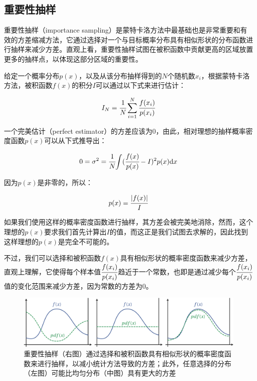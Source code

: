 \subsection{重要性抽样}
重要性抽样（importance sampling）是蒙特卡洛方法中最基础也是非常重要和有效的方差缩减方法，它通过选择对一个与目标概率分布具有相似形状的分布函数进行抽样来减少方差。直观上看，重要性抽样试图在被积函数中贡献更高的区域放置更多的抽样点，以体现这部分区域的重要性。

给定一个概率分布$p(x)$，以及从该分布抽样得到的$N$个随机数$x_i$，根据蒙特卡洛方法，被积函数$f(x)$的积分$I$可以通过以下式来进行估计：

\begin{equation}
	I_N= \cfrac{1}{N}\sum_{i=1}^{N} \cfrac{f(x_i)}{p(x_i)}
\end{equation}

一个完美估计（perfect estimator）的方差应该为0，由此，相对理想的抽样概率密度函数$p(x)$可以从下式推导出：

\begin{equation}
	0=\sigma^2= \cfrac{1}{N}{\rm \int}( \cfrac{f(x)}{p(x)}-I)^2p(x){\rm d}x
\end{equation}

\noindent 因为$p(x)$是非零的，所以：

\begin{equation}
	p(x)= \cfrac{|f(x)|}{I}
\end{equation}

如果我们使用这样的概率密度函数进行抽样，其方差会被完美地消除，然而，这个理想的$p(x)$要求我们首先计算出$I$的值，而这正是我们试图去求解的，因此找到这样理想的$p(x)$是完全不可能的。

不过，我们可以选择和被积函数$f(x)$具有相似形状的概率密度函数来减少方差，直观上理解，它使得每个样本值$ \cfrac{f(x_i)}{p(x_i)}$趋近于一个常数，也即是通过减少每个$ \cfrac{f(x_i)}{p(x_i)}$值的变化范围来减少方差，因为常数的方差为0。

\begin{figure}
	\includegraphics[width=\textwidth]{figures/mc/mc-11}
	\caption{重要性抽样（右图）通过选择和被积函数具有相似形状的概率密度函数来进行抽样，以减小统计方法导致的方差；此外，任意选择的分布（左图）可能比均匀分布（中图）具有更大的方差}
	\label{f:mc-importance-sampling}
\end{figure}

